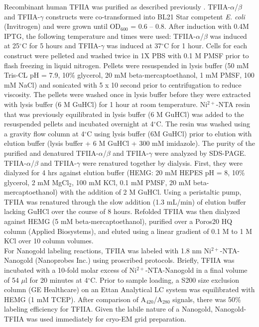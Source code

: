 \indent Recombinant human TFIIA was purified as described previously \cite{Liu_723,Naar_2527,Sun_3221}.  TFIIA-$\alpha$/$\beta$ and TFIIA-$\gamma$ constructs were co-transformed into BL21 Star competent \emph{E. coli} (Invitrogen) and were grown until OD$_{600}$ = 0.6 – 0.8.  After induction with 0.4M IPTG, the following temperature and times were used: TFIIA-$\alpha$/$\beta$ was induced at 25$^{\circ}$C for 5 hours and TFIIA-$\gamma$ was induced at 37$^{\circ}$C for 1 hour.  Cells for each construct were pelleted and washed twice in 1X PBS with 0.1 M PMSF prior to flash freezing in liquid nitrogen.  Pellets were resuspended in lysis buffer (50 mM Tris-CL pH = 7.9, 10\% glycerol, 20 mM beta-mercaptoethanol, 1 mM PMSF, 100 mM NaCl) and sonicated with 5 x 10 second prior to centrifugation to reduce viscosity.  The pellets were washed once in lysis buffer before they were extracted with lysis buffer (6 M GuHCl) for 1 hour at room temperature.  Ni$^{2+}$-NTA resin that was previously equilibrated in lysis buffer (6 M GuHCl) was added to the resuspended pellets and incubated overnight at 4$^{\circ}$C.  The resin was washed using a gravity flow column at 4$^{\circ}$C using lysis buffer (6M GuHCl) prior to elution with elution buffer (lysis buffer + 6 M GuHCl + 300 mM imidazole).  The purity of the purified and denatured TFIIA-$\alpha$/$\beta$ and TFIIA-$\gamma$ were analyzed by SDS-PAGE. TFIIA-$\alpha$/$\beta$ and TFIIA-$\gamma$ were renatured together by dialysis.  First, they were dialyzed for 4 hrs against elution buffer (HEMG: 20 mM HEPES pH = 8, 10\% glycerol, 2 mM MgCl$_{2}$, 100 mM KCl, 0.1 mM PMSF, 20 mM beta-mercaptoethanol) with the addition of 2 M GuHCl.  Using a peristaltic pump, TFIIA was renatured through the slow addition (1.3 mL/min) of elution buffer lacking GuHCl over the course of 8 hours.  Refolded TFIIA was then dialyzed against HEMG (5 mM beta-mercaptoethanol), purified over a Poros20 HQ column (Applied Biosystems), and eluted using a linear gradient of 0.1 M to 1 M KCl over 10 column volumes. \\ 
\indent For Nanogold labeling reactions, TFIIA was labeled with 1.8 nm Ni$^{2+}$-NTA-Nanogold (Nanoprobes Inc.) using proscribed protocols.  Briefly, TFIIA was incubated with a 10-fold molar excess of Ni$^{2+}$-NTA-Nanogold in a final volume of 54 $\mu$l for 20 minutes at 4$^{\circ}$C.  Prior to sample loading, a S200 size exclusion column (GE Healthcare) on an Ettan Analytical LC system was equilibrated with HEMG (1 mM TCEP). After comparison of A$_{420}$/A$_{280}$ signals, there was 50\% labeling efficiency for TFIIA. Given the labile nature of a Nanogold, Nanogold-TFIIA was used immediately for cryo-EM grid preparation.\\

